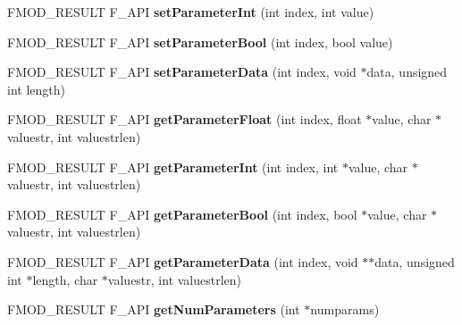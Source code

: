 \begin{DoxyCompactItemize}
\item 
\hypertarget{class_f_m_o_d_1_1_d_s_p_a25fb620fbbca3f4749f891033459f99e}{F\+M\+O\+D\+\_\+\+R\+E\+S\+U\+L\+T F\+\_\+\+A\+P\+I {\bfseries set\+Parameter\+Int} (int index, int value)}\label{class_f_m_o_d_1_1_d_s_p_a25fb620fbbca3f4749f891033459f99e}

\item 
\hypertarget{class_f_m_o_d_1_1_d_s_p_aed896ed8f8d3998ce2fcdec70638a135}{F\+M\+O\+D\+\_\+\+R\+E\+S\+U\+L\+T F\+\_\+\+A\+P\+I {\bfseries set\+Parameter\+Bool} (int index, bool value)}\label{class_f_m_o_d_1_1_d_s_p_aed896ed8f8d3998ce2fcdec70638a135}

\item 
\hypertarget{class_f_m_o_d_1_1_d_s_p_a9faf74d474b3c55f149830745e03d6a7}{F\+M\+O\+D\+\_\+\+R\+E\+S\+U\+L\+T F\+\_\+\+A\+P\+I {\bfseries set\+Parameter\+Data} (int index, void $\ast$data, unsigned int length)}\label{class_f_m_o_d_1_1_d_s_p_a9faf74d474b3c55f149830745e03d6a7}

\item 
\hypertarget{class_f_m_o_d_1_1_d_s_p_a9c39fc71ec08a47344defe07594ccb80}{F\+M\+O\+D\+\_\+\+R\+E\+S\+U\+L\+T F\+\_\+\+A\+P\+I {\bfseries get\+Parameter\+Float} (int index, float $\ast$value, char $\ast$valuestr, int valuestrlen)}\label{class_f_m_o_d_1_1_d_s_p_a9c39fc71ec08a47344defe07594ccb80}

\item 
\hypertarget{class_f_m_o_d_1_1_d_s_p_a3ec0a889d95b1ebc5bff08d78fc13587}{F\+M\+O\+D\+\_\+\+R\+E\+S\+U\+L\+T F\+\_\+\+A\+P\+I {\bfseries get\+Parameter\+Int} (int index, int $\ast$value, char $\ast$valuestr, int valuestrlen)}\label{class_f_m_o_d_1_1_d_s_p_a3ec0a889d95b1ebc5bff08d78fc13587}

\item 
\hypertarget{class_f_m_o_d_1_1_d_s_p_addad4ecd4b44b59492d93be8e78e23dd}{F\+M\+O\+D\+\_\+\+R\+E\+S\+U\+L\+T F\+\_\+\+A\+P\+I {\bfseries get\+Parameter\+Bool} (int index, bool $\ast$value, char $\ast$valuestr, int valuestrlen)}\label{class_f_m_o_d_1_1_d_s_p_addad4ecd4b44b59492d93be8e78e23dd}

\item 
\hypertarget{class_f_m_o_d_1_1_d_s_p_aea796a0521ef8fd6027f8683bcf4c879}{F\+M\+O\+D\+\_\+\+R\+E\+S\+U\+L\+T F\+\_\+\+A\+P\+I {\bfseries get\+Parameter\+Data} (int index, void $\ast$$\ast$data, unsigned int $\ast$length, char $\ast$valuestr, int valuestrlen)}\label{class_f_m_o_d_1_1_d_s_p_aea796a0521ef8fd6027f8683bcf4c879}

\item 
\hypertarget{class_f_m_o_d_1_1_d_s_p_aba45842920caedf11c614d77aa028ab3}{F\+M\+O\+D\+\_\+\+R\+E\+S\+U\+L\+T F\+\_\+\+A\+P\+I {\bfseries get\+Num\+Parameters} (int $\ast$numparams)}\label{class_f_m_o_d_1_1_d_s_p_aba45842920caedf11c614d77aa028ab3}


\end{DoxyCompactItemize}
